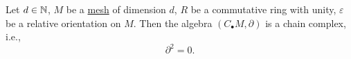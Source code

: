 \begin{proposition}
  Let
    $d \in \mathbb{N}$,
    $M$ be a \hyperref[idec:mesh:definition]{mesh} of dimension $d$,
    $R$ be a commutative ring with unity,
    $\varepsilon$ be a relative orientation on $M$.
  Then the algebra $(C_\bullet M, \partial)$ is a chain complex, i.e.,
  \begin{equation}
    \partial^2 = 0.
  \end{equation}
\end{proposition}
